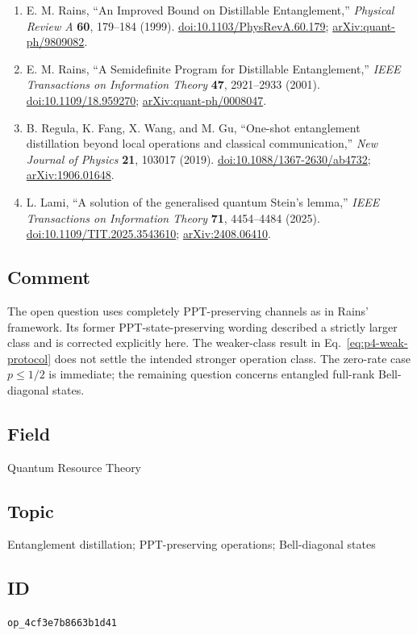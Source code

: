 \begin{enumerate}[label={},leftmargin=4.8em,labelsep=0.5em]
  \footnotesize
  \item[\textup{[Rai99]}]\label{ref:p4-rains-1999}
  E. M. Rains, ``An Improved Bound on Distillable Entanglement,''
  \emph{Physical Review A} \textbf{60}, 179--184 (1999).
  \newline
  \href{https://doi.org/10.1103/PhysRevA.60.179}{doi:10.1103/PhysRevA.60.179};
  \href{https://arxiv.org/abs/quant-ph/9809082}{arXiv:quant-ph/9809082}.

  \item[\textup{[Rai01]}]\label{ref:p4-rains-2001}
  E. M. Rains, ``A Semidefinite Program for Distillable Entanglement,''
  \emph{IEEE Transactions on Information Theory} \textbf{47}, 2921--2933
  (2001). \href{https://doi.org/10.1109/18.959270}{doi:10.1109/18.959270};
  \href{https://arxiv.org/abs/quant-ph/0008047}{arXiv:quant-ph/0008047}.

  \item[\textup{[RFWG19]}]\label{ref:p4-regula-et-al}
  B. Regula, K. Fang, X. Wang, and M. Gu, “One-shot entanglement
distillation beyond local operations and classical communication,”
\emph{New Journal of Physics} \textbf{21}, 103017 (2019).
\href{https://doi.org/10.1088/1367-2630/ab4732}{doi:10.1088/1367-2630/ab4732};
\href{https://arxiv.org/abs/1906.01648}{arXiv:1906.01648}.

  \item[\textup{[Lam25]}]\label{ref:p4-lami}
  L. Lami, “A solution of the generalised quantum Stein's lemma,”
\emph{IEEE Transactions on Information Theory} \textbf{71},
4454--4484 (2025).
\href{https://doi.org/10.1109/TIT.2025.3543610}{doi:10.1109/TIT.2025.3543610};
\href{https://arxiv.org/abs/2408.06410}{arXiv:2408.06410}.
\end{enumerate}

\subsection*{Comment}

The open question uses completely PPT-preserving channels as in Rains'
framework. Its former PPT-state-preserving wording described a strictly
larger class and is corrected explicitly here. The weaker-class result in
Eq.~\eqref{eq:p4-weak-protocol} does not settle the intended stronger
operation class. The zero-rate case $p\leq1/2$ is immediate; the remaining
question concerns entangled full-rank Bell-diagonal states.

\subsection*{Field}

Quantum Resource Theory

\subsection*{Topic}

Entanglement distillation; PPT-preserving operations; Bell-diagonal states

\subsection*{ID}

\texttt{op\_4cf3e7b8663b1d41}
